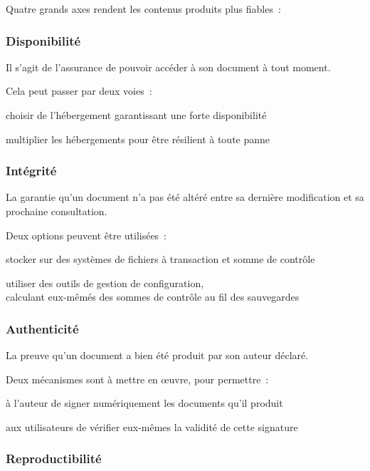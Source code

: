 Quatre grands axes rendent les contenus produits plus fiables :

\subsubsection{Disponibilité}

Il s’agit de l’assurance de pouvoir accéder à son document à tout moment.

Cela peut passer par deux voies :
\begin{itmz}
\item{choisir de l’hébergement garantissant une forte disponibilité}
\item{multiplier les hébergements pour être résilient à toute panne}
\end{itmz}

\pagebreak

\subsubsection{Intégrité}

La garantie qu’un document n’a pas été altéré
entre sa dernière modification et sa prochaine consultation.

Deux options peuvent être utilisées :
\begin{itmz}
\item{stocker sur des systèmes de fichiers à transaction et somme de contrôle}
\item{utiliser des outils de gestion de configuration,\\
calculant eux-mêmés des sommes de contrôle au fil des sauvegardes}
\end{itmz}

\subsubsection{Authenticité}

La preuve qu’un document a bien été produit par son auteur déclaré.

Deux mécanismes sont à mettre en œuvre, pour permettre :
\begin{itmz}
\item{à l’auteur de signer numériquement les documents qu’il produit}
\item{aux utilisateurs de vérifier eux-mêmes la validité de cette signature}
\end{itmz}

\subsubsection{Reproductibilité}

